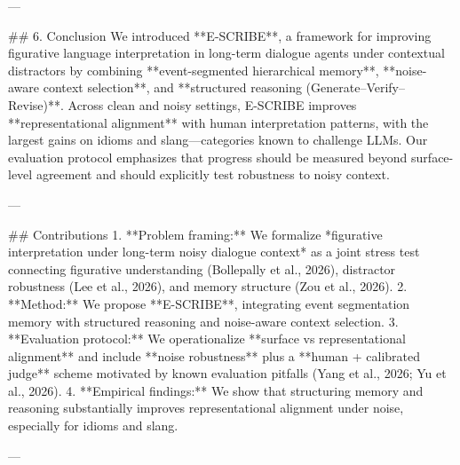 ---

## 6. Conclusion  
We introduced **E-SCRIBE**, a framework for improving figurative language interpretation in long-term dialogue agents under contextual distractors by combining **event-segmented hierarchical memory**, **noise-aware context selection**, and **structured reasoning (Generate–Verify–Revise)**. Across clean and noisy settings, E-SCRIBE improves **representational alignment** with human interpretation patterns, with the largest gains on idioms and slang—categories known to challenge LLMs. Our evaluation protocol emphasizes that progress should be measured beyond surface-level agreement and should explicitly test robustness to noisy context.

---

## Contributions  
1. **Problem framing:** We formalize *figurative interpretation under long-term noisy dialogue context* as a joint stress test connecting figurative understanding (Bollepally et al., 2026), distractor robustness (Lee et al., 2026), and memory structure (Zou et al., 2026).  
2. **Method:** We propose **E-SCRIBE**, integrating event segmentation memory with structured reasoning and noise-aware context selection.  
3. **Evaluation protocol:** We operationalize **surface vs representational alignment** and include **noise robustness** plus a **human + calibrated judge** scheme motivated by known evaluation pitfalls (Yang et al., 2026; Yu et al., 2026).  
4. **Empirical findings:** We show that structuring memory and reasoning substantially improves representational alignment under noise, especially for idioms and slang.

---